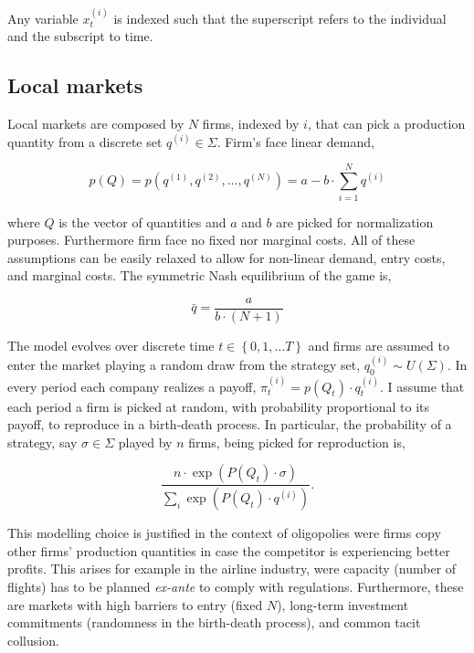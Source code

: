 \documentclass[american]{scrartcl}
\newcommand{\set}[1]{\left\{#1\right\}}
\begin{document}
Any variable $x^{(i)}_t$ is indexed such that the superscript refers to the individual and the subscript to time.

\subsection{Local markets}

Local markets are composed by $N$ firms, indexed by $i$, that can pick a production quantity from a discrete set $q^{(i)} \in \Sigma$. Firm's face linear demand,

\begin{equation}
    p(Q) = p\left(q^{(1)}, q^{(2)},  \ldots, q^{(N)} \right) = a - b \cdot \sum^{N}_{i=1} q^{(i)}
\end{equation}

where $Q$ is the vector of quantities and $a$ and $b$ are picked for normalization purposes. Furthermore firm face no fixed nor marginal costs. All of these assumptions can be easily relaxed to allow for non-linear demand, entry costs, and marginal costs. The symmetric Nash equilibrium of the game is,

\begin{equation}
    \bar{q}= \frac{a}{b \cdot (N+1)}
\end{equation}



The model evolves over discrete time $t \in \set{0, 1, \ldots T}$ and firms are assumed to enter the market playing a random draw from the strategy set,  $q^{(i)}_0 \sim U(\Sigma)$. In every period each company realizes a payoff, $\pi^{(i)}_t = p(Q_t) \cdot q^{(i)}_t$. I assume that each period a firm is picked at random, with probability proportional to its payoff, to reproduce in a birth-death process. In particular, the probability of a strategy, say $\sigma \in \Sigma$ played by $n$ firms, being picked for reproduction is,

\begin{equation}
    \frac{n \cdot \exp(P(Q_t) \cdot \sigma)}{\sum_{i} \exp(P(Q_t) \cdot q^{(i)})}.
\end{equation}



This modelling choice is justified in the context of oligopolies were firms copy other firms' production quantities in case the competitor is experiencing better profits. This arises for example in the airline industry, were capacity (number of flights) has to be planned \textit{ex-ante} to comply with regulations. Furthermore, these are markets with high barriers to entry (fixed $N$), long-term investment commitments (randomness in the birth-death process), and common tacit collusion.
\end{document}
